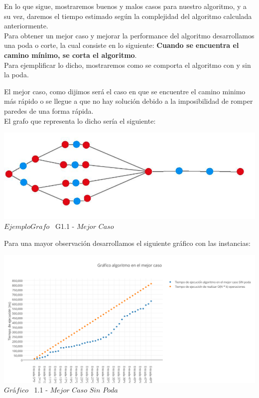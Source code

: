 \indent En lo que sigue, mostraremos buenos y malos casos para nuestro algoritmo, y a su vez, daremos el tiempo estimado 
seg\'un la complejidad del algoritmo calculada anteriormente.\\


 Para obtener un mejor caso y mejorar la performance del algoritmo desarrollamos una poda o corte, la cual consiste en lo siguiente: \textbf{Cuando se encuentra el camino m\'inimo, se corta el algoritmo}.\\

Para ejemplificar lo dicho, mostraremos como se comporta el algoritmo con y sin la poda.

El mejor caso, como dijimos ser\'a el caso en que se encuentre el camino minimo m\'as r\'apido o se llegue a que no hay soluci\'on debido a la imposibilidad de romper paredes de una forma r\'apida.\\

El grafo que representa lo dicho ser\'ia el siguiente:\\

\vspace*{0.3cm} \vspace*{0.3cm}
  \begin{center}
\includegraphics[scale=0.65]{./EJ1/ej1grafomejorcaso.jpeg}
{$Ejemplo Grafo$ \ G1.1 - $Mejor$ $Caso$}
  \end{center}
  \vspace*{0.3cm}


Para una mayor observaci\'on desarrollamos el siguiente gr\'afico con las instancias:\\

\vspace*{0.3cm} \vspace*{0.3cm}
  \begin{center}
 \includegraphics[scale=0.65]{./EJ1/mejorcaso.png}
 {$Gr$\'a$fico$ \ 1.1 - $Mejor$ $Caso$ $Sin$ $Poda$}
  \end{center}
  \vspace*{0.3cm}

